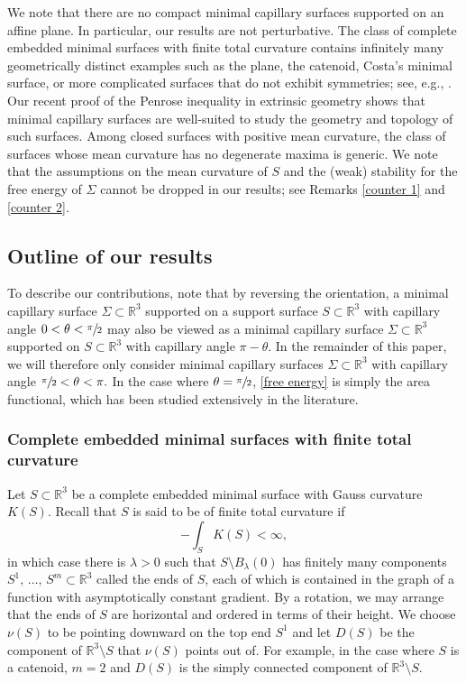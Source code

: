 \documentclass[11pt]{amsart}
\begin{document}
We note that there are no compact minimal capillary surfaces supported on an affine plane. In particular, our results are not perturbative. 
The class of complete embedded minimal surfaces with finite total curvature contains infinitely many geometrically distinct examples such as the plane, the catenoid,  Costa's minimal surface, or more complicated surfaces that do not exhibit symmetries; see, e.g.,  \cite{Costa,Traizet}. Our recent proof of the Penrose inequality in extrinsic geometry \cite{eichmair2024penrose} shows that minimal capillary surfaces are well-suited to study the geometry and topology of such surfaces.
 Among closed surfaces with positive mean curvature, the class of surfaces whose mean curvature has no degenerate maxima is generic. 
  We note that the assumptions on the mean curvature of $S$ and the (weak) stability for the free energy of $\Sigma$ cannot be dropped in our results; see Remarks \ref{counter 1} and \ref{counter 2}.

\subsection*{Outline of our results} To describe our contributions, note that by reversing the orientation, a minimal capillary surface $\Sigma\subset \mathbb{R}^3$  supported on a support surface $S\subset \mathbb{R}^3$ with  capillary angle $0<\theta<\sfrac{\pi}2$ may also be viewed  as a minimal capillary surface $\Sigma\subset \mathbb{R}^3$  supported on   $S\subset \mathbb{R}^3$ with  capillary angle $\pi-\theta$. In the remainder of this paper, we will therefore only  consider minimal capillary surfaces $\Sigma \subset \mathbb{R}^3$ with capillary angle $\sfrac{\pi}2<\theta<\pi.$ In the case where $\theta=\sfrac{\pi}2$, \eqref{free energy} is simply the area functional, which has been studied extensively in the literature. 

\subsubsection*{Complete embedded minimal surfaces with finite total curvature}
 
Let $S\subset \mathbb{R}^3$ be a complete embedded minimal surface with Gauss curvature $K(S)$. Recall that $S$ is said to be of finite total curvature if 
$$
-\int_S K(S)<\infty,
$$
in which case there is $\lambda>0$ such that $S\setminus B_\lambda(0)$ has finitely many components $S^1,\,\ldots,\,S^m\subset \mathbb{R}^3$ called the ends of $S$, each of which is contained in the graph of a function with asymptotically constant gradient. By a rotation, we may arrange that the ends of $S$ are horizontal and ordered in terms of their height.  We choose $\nu(S)$ to be pointing downward on the top end $S^1$ and let $D(S)$ be the component of $\mathbb{R}^3\setminus S$ that $\nu(S)$ points out of. For example, in the case where $S$ is a catenoid, $m=2$ and $D(S)$ is the simply connected component of $\mathbb{R}^3\setminus S$.  
\end{document}
